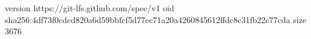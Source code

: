 version https://git-lfs.github.com/spec/v1
oid sha256:4df73f0cdcd820a6d59bbfcf5d77ec71a20a4260845612ffdc8c31fb22c77cda
size 3676
